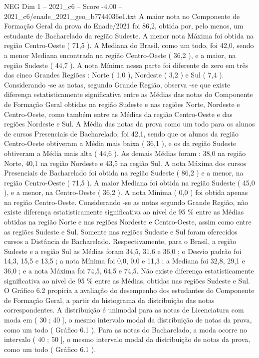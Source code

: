 \begin{textsample}{NEG Dim 1 – 2021\_c6 – Score -4.00 – 2021\_c6/enade\_2021\_geo\_b7744036e1.txt}
A maior nota no Componente de Formação Geral da prova do Enade/2021 foi 86,2, obtida por, pelo menos, um estudante de Bacharelado da região Sudeste.
A menor nota Máxima foi obtida na região Centro-Oeste ( 71,5 ).
A Mediana do Brasil, como um todo, foi 42,0, sendo a menor Mediana encontrada na região Centro-Oeste ( 36,2 ), e a maior, na região Sudeste ( 44,7 ).
A nota Mínima nessa parte foi diferente de zero em três das cinco Grandes Regiões : Norte ( 1,0 ), Nordeste ( 3,2 ) e Sul ( 7,4 ).
Considerando -se as notas, segundo Grande Região, observa -se que existe diferença estatisticamente significativa entre as Médias das notas do Componente de Formação Geral obtidas na região Sudeste e nas regiões Norte, Nordeste e Centro-Oeste, como também entre as Médias da região Centro-Oeste e das regiões Nordeste e Sul.
A Média das notas da prova como um todo para os alunos de cursos Presenciais de Bacharelado, foi 42,1, sendo que os alunos da região Centro-Oeste obtiveram a Média mais baixa ( 36,1 ), e os da região Sudeste obtiveram a Média mais alta ( 44,6 ).
As demais Médias foram : 38,0 na região Norte, 40,1 na região Nordeste e 43,5 na região Sul.
A nota Máxima dos cursos Presenciais de Bacharelado foi obtida na região Sudeste ( 86,2 ) e a menor, na região Centro-Oeste ( 71,5 ).
A maior Mediana foi obtida na região Sudeste ( 45,0 ), e a menor, na Centro-Oeste ( 36,2 ).
A nota Mínima ( 0,0 ) foi obtida apenas na região Centro-Oeste.
Considerando -se as notas segundo Grande Região, não existe diferença estatisticamente significativa ao nível de 95 \% entre as Médias obtidas na região Norte e nas regiões Nordeste e Centro-Oeste, assim como entre as regiões Sudeste e Sul.
Somente nas regiões Sudeste e Sul foram oferecidos cursos a Distância de Bacharelado.
Respectivamente, para o Brasil, a região Sudeste e a região Sul as Médias foram 34,5, 31,6 e 36,0 ; o Desvio padrão foi 14,3, 15,5 e 13,5 ; a nota Mínima foi 0,0, 0,0 e 11,3 ; a Mediana foi 32,8, 29,1 e 36,0 ; e a nota Máxima foi 74,5, 64,5 e 74,5.
Não existe diferença estatisticamente significativa ao nível de 95 \% entre as Médias, obtidas nas regiões Sudeste e Sul.
O Gráfico 6.2 propicia a avaliação do desempenho dos estudantes do Componente de Formação Geral, a partir do histograma da distribuição das notas correspondentes.
A distribuição é unimodal para as notas de Licenciatura com moda em ( 30 ; 40 ], o mesmo intervalo modal da distribuição de notas da prova, como um todo ( Gráfico 6.1 ).
Para as notas do Bacharelado, a moda ocorre no intervalo ( 40 ; 50 ], o mesmo intervalo modal da distribuição de notas da prova, como um todo ( Gráfico 6.1 ).

\end{textsample}

